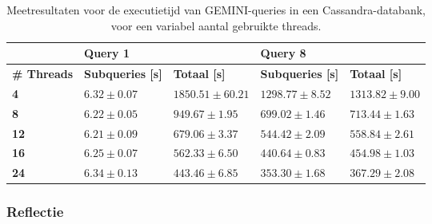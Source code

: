 \begin{table}[!h]
\begin{tabular}{@{}lllll@{}}
\cmidrule(l){2-5}
                                       & \multicolumn{2}{|l|}{\textbf{Query 1}}                                                      & \multicolumn{2}{l|}{\textbf{Query 8}}                             \\ 
\midrule
\multicolumn{1}{|l|}{\textbf{\# Threads}}  & \multicolumn{1}{l|}{\textbf{Subqueries [s]}}               & \multicolumn{1}{l|}{\textbf{Totaal [s]}} & \multicolumn{1}{l|}{\textbf{Subqueries [s]}} & \multicolumn{1}{l|}{\textbf{Totaal [s]}} \\ \midrule
\multicolumn{1}{|l|}{\textbf{4}} & \multicolumn{1}{l|}{$6.32 \pm 0.07$} & \multicolumn{1}{l|}{$1850.51 \pm 60.21$}             & \multicolumn{1}{l|}{$1298.77 \pm 8.52$}          & \multicolumn{1}{l|}{$1313.82 \pm 9.00$}                        \\
\multicolumn{1}{|l|}{\textbf{8}} & \multicolumn{1}{l|}{$6.22 \pm 0.05$} &\multicolumn{1}{l|}{$949.67 \pm 1.95$}            & \multicolumn{1}{l|}{$699.02 \pm 1.46$}          & \multicolumn{1}{l|}{$713.44 \pm 1.63$}                        \\
\multicolumn{1}{|l|}{\textbf{12}} & \multicolumn{1}{l|}{$6.21 \pm 0.09$} &\multicolumn{1}{l|}{$679.06 \pm 3.37$}            & \multicolumn{1}{l|}{$544.42 \pm 2.09$}           & \multicolumn{1}{l|}{$558.84 \pm 2.61$}                        \\
\multicolumn{1}{|l|}{\textbf{16}} & \multicolumn{1}{l|}{$6.25 \pm 0.07$} &\multicolumn{1}{l|}{$562.33 \pm 6.50$}                 & \multicolumn{1}{l|}{$440.64 \pm 0.83$}                    & \multicolumn{1}{l|}{$454.98 \pm 1.03$}                        \\
\multicolumn{1}{|l|}{\textbf{24}} & \multicolumn{1}{l|}{$6.34 \pm 0.13$} &\multicolumn{1}{l|}{$443.46 \pm 6.85$}          & \multicolumn{1}{l|}{$353.30 \pm 1.68$}           & \multicolumn{1}{l|}{$367.29 \pm 2.08$}                        \\
\bottomrule
\end{tabular}
\caption{Meetresultaten voor de executietijd van GEMINI-queries in een Cassandra-databank, voor een variabel aantal gebruikte threads.}
\end{table}

\subsubsection{Reflectie}

